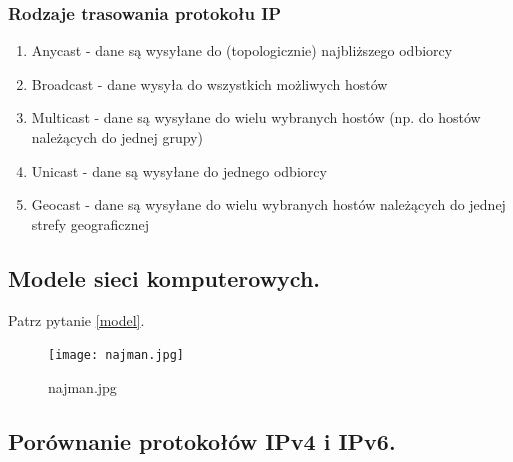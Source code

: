 \documentclass[a4paper,12pt,oneside]{book}
\begin{document}
			\subsubsection{Rodzaje trasowania protokołu IP}
			\begin{enumerate}
				\item Anycast - dane są wysyłane do (topologicznie) najbliższego odbiorcy
				\item Broadcast - dane wysyła do wszystkich możliwych hostów
				\item Multicast - dane są wysyłane do wielu wybranych hostów (np. do hostów należących
				do jednej grupy)
				\item Unicast - dane są wysyłane do jednego odbiorcy
				\item Geocast - dane są wysyłane do wielu wybranych hostów należących do jednej strefy
				geograficznej
			\end{enumerate}
			\newpage\subsection{Modele sieci komputerowych.}
				Patrz pytanie \ref{model}.
				\begin{figure}[h!]
					\centering\texttt{[image: najman.jpg]}
					\caption{najman.jpg}
				\end{figure}
			\newpage\subsection{Porównanie protokołów IPv4 i IPv6.}
\end{document}
